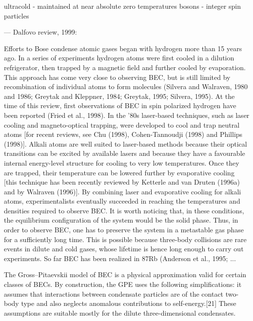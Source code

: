 




ultracold - maintained at near absolute zero temperatures
bosons - integer spin particles


---
Dalfovo review, 1999:

Efforts to Bose condense atomic gases began with hydrogen more than 15 years ago. In a series of experiments hydrogen atoms were first cooled in a dilution refrigerator, then trapped by a magnetic field and further cooled by evaporation. This approach has come very close to observing BEC, but is still limited by recombination of individual atoms to form molecules (Silvera and Walraven, 1980 and 1986; Greytak and Kleppner, 1984; Greytak, 1995; Silvera, 1995). At the time of this review, first observations of BEC in spin polarized hydrogen have been reported (Fried et al., 1998). In the ’80s laser-based techniques, such as laser cooling and magneto-optical trapping, were developed to cool and trap neutral atoms [for recent reviews, see Chu (1998), Cohen-Tannoudji (1998) and Phillips (1998)]. Alkali atoms are well suited to laser-based methods because their optical transitions can be excited by available lasers and because they have a favourable internal energy-level structure for cooling to very low temperatures. Once they are trapped, their temperature can be lowered further by evaporative cooling [this technique has been recently reviewed by Ketterle and van Druten (1996a) and by Walraven (1996)]. By combining laser and evaporative cooling for alkali atoms, experimentalists eventually succeeded in reaching the temperatures and densities required to observe BEC. It is worth noticing that, in these conditions, the equilibrium configuration of the system would be the solid phase. Thus, in order to observe BEC, one has to preserve the system in a metastable gas phase for a sufficiently long time. This is possible because three-body collisions are rare events in dilute and cold gases, whose lifetime is hence long enough to carry out experiments. So far BEC has been realized in 87Rb (Anderson et al., 1995; ...



The Gross–Pitaevskii model of BEC is a physical approximation valid for certain classes of BECs. By construction, the GPE uses the following simplifications: it assumes that interactions between condensate particles are of the contact two-body type and also neglects anomalous contributions to self-energy.[21] These assumptions are suitable mostly for the dilute three-dimensional condensates. 

